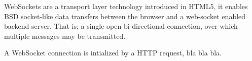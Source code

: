WebSockets are a transport layer technology introduced in HTML5, it enables BSD
socket-like data transfers between the browser and a web-socket enabled backend
server. That is; a single open bi-directional connection, over which multiple
messages may be transmitted.

A WebSocket connection is intialized by a HTTP request, bla bla bla.

